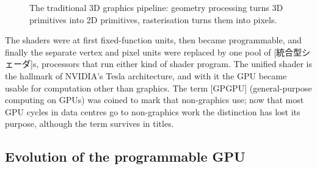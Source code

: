 \documentclass[../main.tex]{subfiles}
\begin{document}
\begin{figure}[htbp]
  \centering
  
  \caption{The traditional 3D graphics pipeline: geometry processing turns
    3D primitives into 2D primitives, rasterisation turns them into
    pixels.}
  \label{fig:l01-graphics-pipeline}
\end{figure}

The shaders were at first fixed-function units, then became
programmable, and finally the separate vertex and pixel units were
replaced by one pool of [統合型シェーダ]s, processors
that run either kind of shader program.  The unified shader is the
hallmark of NVIDIA's Tesla architecture, and with it the GPU became
usable for computation other than graphics.  The term [GPGPU] (general-purpose
computing on GPUs) was coined to mark that non-graphics use; now that
most GPU cycles in data centres go to non-graphics work the
distinction has lost its purpose, although the term survives in
titles.

\subsection{Evolution of the programmable GPU}
\end{document}
